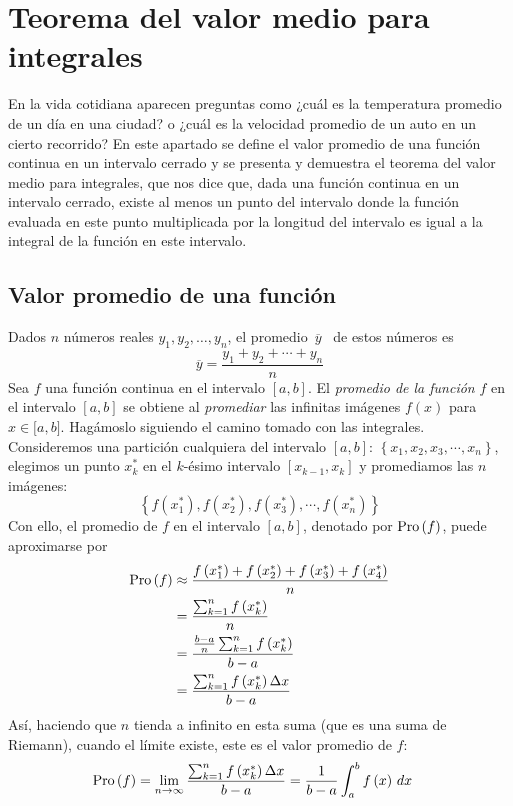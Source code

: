 \section{Teorema del valor medio para integrales}
En la vida cotidiana aparecen preguntas como ¿cuál es la temperatura promedio de un día en una ciudad? o ¿cuál es la velocidad promedio de un auto en un cierto recorrido? En este apartado se define el valor promedio de una función continua en un intervalo cerrado y se presenta y demuestra el teorema del valor medio para integrales, que nos dice que, dada una función continua en un intervalo cerrado, existe al menos un punto del intervalo donde la función evaluada en este punto multiplicada por la longitud del intervalo es igual a la integral de la función en este intervalo.

\subsection{Valor promedio de una función}

Dados $n$ números reales $y_{1},y_{2},\ldots,y_{n}$, el promedio\ $\overline{y}$%
\ de estos números es
\[
  \overline{y}=\frac{y_{1}+y_{2}+\cdots+y_{n}}{n}
\]
Sea $f$ una función continua en el intervalo $[a,b]$. El \textit{promedio de la función} $f$ en el intervalo $[a,b]$ se obtiene al \textit{promediar} las infinitas imágenes $f(x) $ para $x\in \lbrack a,b]$. Hagámoslo siguiendo el camino tomado con las integrales. Consideremos una partición cualquiera del intervalo $[a,b]$: $\left\{ x_{1},x_{2},x_{3},\cdots ,x_{n}\right\} $,
elegimos un punto $x_{k}^{\ast }$ en el $k$-ésimo intervalo $%
[x_{k-1},x_{k}]$ y promediamos las $n$ imágenes:
\begin{equation*}
\left\{ f\left( x_{1}^{\ast
  }\right) ,f\left( x_{2}^{\ast }\right) ,f\left( x_{3}^{\ast }\right) ,\cdots
,f\left( x_{n}^{\ast }\right) \right\}
\end{equation*}
Con ello, el promedio de $f$ en el intervalo $[a,b]$, denotado por $\operatorname{Pro}\left( f\right) $, puede aproximarse por
\begin{align*}
\operatorname{Pro}\left( f\right) &\approx \frac{f\left( x_{1}^{\ast }\right) +f\left(
  x_{2}^{\ast }\right) +f\left( x_{3}^{\ast }\right) +f\left( x_{4}^{\ast
}\right) }{n}\\
&=\frac{\sum_{k=1}^{n}f\left( x_{k}^{\ast }\right) }{n}\\
&=\frac{\frac{b-a}{n}\sum_{k=1}^{n}f\left( x_{k}^{\ast }\right) }{b-a}\\
&=\frac{\sum_{k=1}^{n}f\left( x_{k}^{\ast }\right) \Delta x}{b-a}
\end{align*}
Así, haciendo que $n$ tienda a infinito en esta suma (que es una
suma de Riemann), cuando el límite existe, este es el valor promedio de $f$:
\begin{align*}
\operatorname{Pro}\left( f\right)&=\lim_{n\rightarrow \infty }\frac{\sum_{k=1}^{n}f\left(
x_{k}^{\ast }\right) \Delta x}{b-a}=\frac{1}{b-a}\int_{a}^{b}f\left(
x\right)\,dx
\end{align*}

